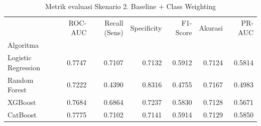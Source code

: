 \begin{table}[htbp]
\caption{Metrik evaluasi Skenario 2. Baseline + Class Weighting}
\label{tab:ablasi2}
\begin{tabular}{lrrrrrr}
\toprule
 & ROC-AUC & Recall (Sens) & Specificity & F1-Score & Akurasi & PR-AUC \\
Algoritma &  &  &  &  &  &  \\
\midrule
Logistic Regression & 0.7747 & 0.7107 & 0.7132 & 0.5912 & 0.7124 & 0.5814 \\
Random Forest & 0.7222 & 0.4390 & 0.8316 & 0.4755 & 0.7167 & 0.4983 \\
XGBoost & 0.7684 & 0.6864 & 0.7237 & 0.5830 & 0.7128 & 0.5671 \\
CatBoost & 0.7775 & 0.7102 & 0.7141 & 0.5914 & 0.7129 & 0.5850 \\
\bottomrule
\end{tabular}
\end{table}
